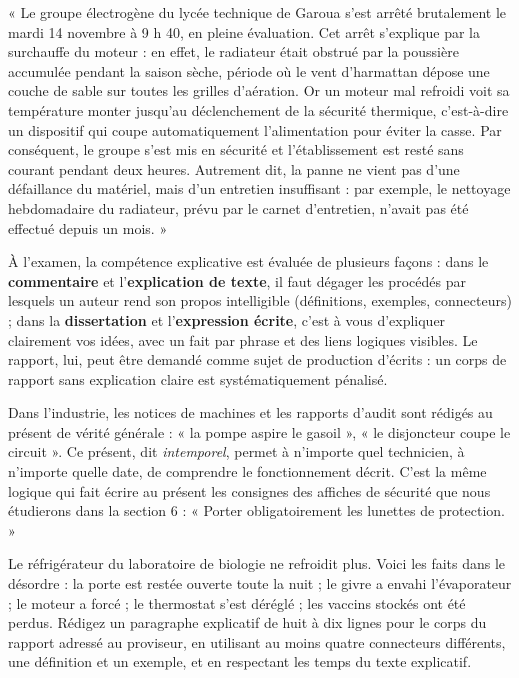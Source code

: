 \documentclass[11pt]{article}
\newcounter{popsec}
\newcounter{popsub}
\newcommand{\courssub}[1]{%
  \stepcounter{popsub}%
  \par\vspace{9pt}\noindent{\popxbold\fontsize{11.5}{13}\selectfont\color{popink}{\color{poporange}\thepopsec.\thepopsub}\hspace{6pt}#1}\par\nopagebreak\vspace{4pt}
}
\begin{document}
\begin{exemplebox}
« Le groupe électrogène du lycée technique de Garoua s'est arrêté brutalement le mardi 14 novembre à 9 h 40, en pleine évaluation. Cet arrêt s'explique par la surchauffe du moteur : en effet, le radiateur était obstrué par la poussière accumulée pendant la saison sèche, période où le vent d'harmattan dépose une couche de sable sur toutes les grilles d'aération. Or un moteur mal refroidi voit sa température monter jusqu'au déclenchement de la sécurité thermique, c'est-à-dire un dispositif qui coupe automatiquement l'alimentation pour éviter la casse. Par conséquent, le groupe s'est mis en sécurité et l'établissement est resté sans courant pendant deux heures. Autrement dit, la panne ne vient pas d'une défaillance du matériel, mais d'un entretien insuffisant : par exemple, le nettoyage hebdomadaire du radiateur, prévu par le carnet d'entretien, n'avait pas été effectué depuis un mois. »
\end{exemplebox}

\courssub{Lien avec le Probatoire et le Baccalauréat technique}

À l'examen, la compétence explicative est évaluée de plusieurs façons : dans le \textbf{commentaire} et l'\textbf{explication de texte}, il faut dégager les procédés par lesquels un auteur rend son propos intelligible (définitions, exemples, connecteurs) ; dans la \textbf{dissertation} et l'\textbf{expression écrite}, c'est à vous d'expliquer clairement vos idées, avec un fait par phrase et des liens logiques visibles. Le rapport, lui, peut être demandé comme sujet de production d'écrits : un corps de rapport sans explication claire est systématiquement pénalisé.

\begin{savaistu}
Dans l'industrie, les notices de machines et les rapports d'audit sont rédigés au présent de vérité générale : « la pompe aspire le gasoil », « le disjoncteur coupe le circuit ». Ce présent, dit \emph{intemporel}, permet à n'importe quel technicien, à n'importe quelle date, de comprendre le fonctionnement décrit. C'est la même logique qui fait écrire au présent les consignes des affiches de sécurité que nous étudierons dans la section 6 : « Porter obligatoirement les lunettes de protection. »
\end{savaistu}

\begin{exercice}
Le réfrigérateur du laboratoire de biologie ne refroidit plus. Voici les faits dans le désordre : la porte est restée ouverte toute la nuit ; le givre a envahi l'évaporateur ; le moteur a forcé ; le thermostat s'est déréglé ; les vaccins stockés ont été perdus. Rédigez un paragraphe explicatif de huit à dix lignes pour le corps du rapport adressé au proviseur, en utilisant au moins quatre connecteurs différents, une définition et un exemple, et en respectant les temps du texte explicatif.
\end{exercice}
\end{document}
